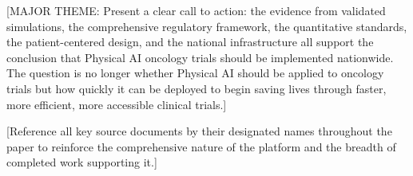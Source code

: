 [MAJOR THEME: Present a clear call to action: the evidence from validated
simulations, the comprehensive regulatory framework, the quantitative standards,
the patient-centered design, and the national infrastructure all support the
conclusion that Physical AI oncology trials should be implemented nationwide.
The question is no longer whether Physical AI should be applied to oncology
trials but how quickly it can be deployed to begin saving lives through faster,
more efficient, more accessible clinical trials.]

[Reference all key source documents by their designated names throughout the
paper to reinforce the comprehensive nature of the platform and the breadth
of completed work supporting it.]
